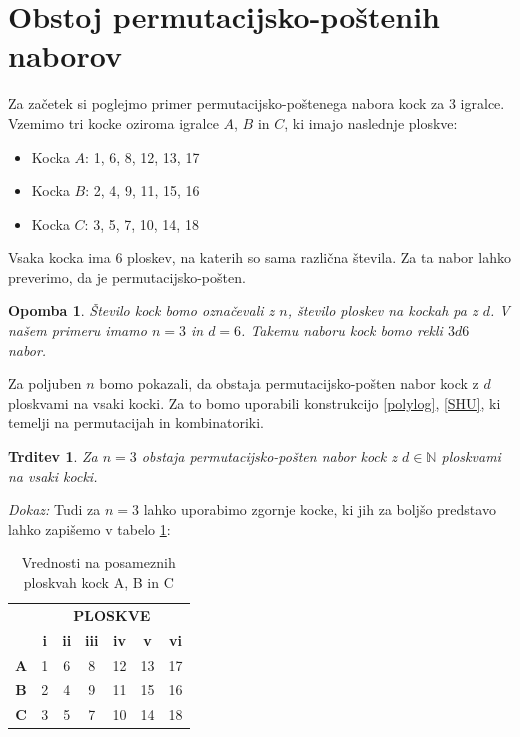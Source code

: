 \documentclass[a4paper, 12pt]{article}
\newtheorem{trditev}[definicija]{Trditev}
\newtheorem{opomba}[definicija]{Opomba}
\begin{document}
\section{Obstoj permutacijsko-poštenih naborov}

Za začetek si poglejmo primer permutacijsko-poštenega nabora kock za 3 igralce. Vzemimo tri kocke oziroma igralce $A$, $B$ in $C$, ki imajo naslednje ploskve:
\begin{itemize}
  \item Kocka $A$: 1, 6, 8, 12, 13, 17
  \item Kocka $B$: 2, 4, 9, 11, 15, 16
  \item Kocka $C$: 3, 5, 7, 10, 14, 18
\end{itemize}

Vsaka kocka ima 6 ploskev, na katerih so sama različna števila. Za ta nabor lahko preverimo, da je permutacijsko-pošten.

\begin{opomba}
  Število kock bomo označevali z $n$, število ploskev na kockah pa z $d$. V našem primeru imamo $n = 3$ in $d = 6$. Takemu naboru kock bomo rekli $3d6$ nabor.
\end{opomba}

Za poljuben $n$ bomo pokazali, da obstaja permutacijsko-pošten nabor kock z $d$ ploskvami na vsaki kocki. Za to bomo uporabili konstrukcijo \ref{polylog}, \ref{SHU}, ki temelji na permutacijah in kombinatoriki.

\begin{trditev}
  Za $n = 3$ obstaja permutacijsko-pošten nabor kock z $d \in \mathbb{N}$ ploskvami na vsaki kocki.
\end{trditev}

{\em Dokaz:\/}
  Tudi za $n = 3$ lahko uporabimo zgornje kocke, ki jih za boljšo predstavo lahko zapišemo v tabelo \ref{tab:3igralci}:
\begin{table}[h!]
\centering
\renewcommand{\arraystretch}{1.5}
\setlength{\tabcolsep}{12pt}
\begin{tabular}{>{\bfseries}c|c c c c c c}
\rowcolor{orange!50}
\multicolumn{1}{c|}{\bfseries KOCKA} & \multicolumn{6}{c}{\bfseries PLOSKVE} \\
\rowcolor{orange!30}
 & \textbf{i} & \textbf{ii} & \textbf{iii} & \textbf{iv} & \textbf{v} & \textbf{vi} \\
A & 1 & 6 & 8 & 12 & 13 & 17 \\
B & 2 & 4 & 9 & 11 & 15 & 16 \\
C & 3 & 5 & 7 & 10 & 14 & 18 \\
\end{tabular}
\caption{Vrednosti na posameznih ploskvah kock A, B in C}
\label{tab:3igralci}
\end{table}
\end{document}
